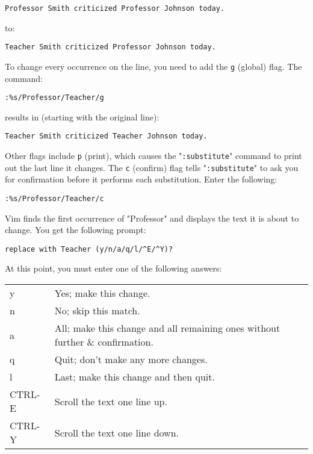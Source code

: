 \begin{Verbatim}[samepage=true]
    Professor Smith criticized Professor Johnson today. 
\end{Verbatim}

to:

\begin{Verbatim}[samepage=true]
    Teacher Smith criticized Professor Johnson today. 
\end{Verbatim}

To change every occurrence on the line, you need to add the \texttt{g} (global) flag.
The command:

\begin{Verbatim}[samepage=true]
 :%s/Professor/Teacher/g
\end{Verbatim}

results in (starting with the original line):

\begin{Verbatim}[samepage=true]
    Teacher Smith criticized Teacher Johnson today. 
\end{Verbatim}

Other flags include \texttt{p} (print), which causes the "\texttt{:substitute}" command to print out the last line it changes.
The \texttt{c} (confirm) flag tells "\texttt{:substitute}" to ask you for confirmation before it performs each substitution.
Enter the following:

\begin{Verbatim}[samepage=true]
 :%s/Professor/Teacher/c
\end{Verbatim}

Vim finds the first occurrence of "Professor" and displays the text it is about to change.
You get the following prompt:

\begin{Verbatim}[samepage=true]
 replace with Teacher (y/n/a/q/l/^E/^Y)?
\end{Verbatim}

At this point, you must enter one of the following answers:

\begin{center}\begin{tabular}{l l}
				y & Yes; make this change. \\
				n & No; skip this match. \\
				a & All; make this change and all remaining ones without further \& confirmation. \\
				q & Quit; don't make any more changes. \\
				l & Last; make this change and then quit. \\
				CTRL-E & Scroll the text one line up. \\
				CTRL-Y & Scroll the text one line down. \\
\end{tabular}\end{center}

